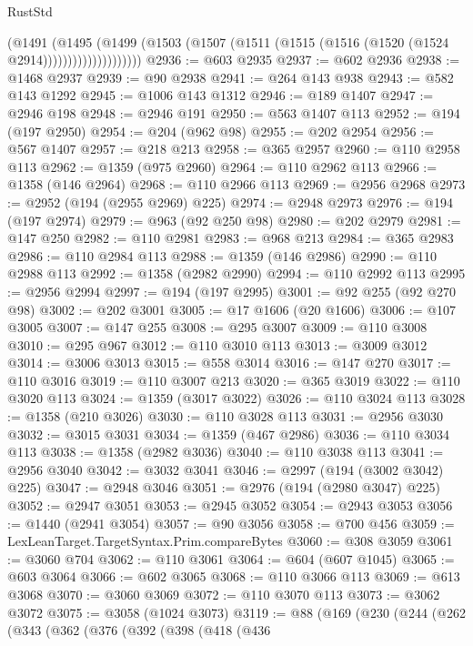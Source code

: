 \begin{lexlean}{RustStd}
\begin{coremodule}
                        (@1491
                          (@1495
                            (@1499
                              (@1503
                                (@1507 (@1511 (@1515 (@1516 (@1520 (@1524 @2914))))))))))))))))))))
@2936 := @603 @2935
@2937 := @602 @2936
@2938 := @1468 @2937
@2939 := @90 @2938
@2941 := @264 @143 @938
@2943 := @582 @143 @1292
@2945 := @1006 @143 @1312
@2946 := @189 @1407
@2947 := @2946 @198
@2948 := @2946 @191
@2950 := @563 @1407 @113
@2952 := @194 (@197 @2950)
@2954 := @204 (@962 @98)
@2955 := @202 @2954
@2956 := @567 @1407
@2957 := @218 @213
@2958 := @365 @2957
@2960 := @110 @2958 @113
@2962 := @1359 (@975 @2960)
@2964 := @110 @2962 @113
@2966 := @1358 (@146 @2964)
@2968 := @110 @2966 @113
@2969 := @2956 @2968
@2973 := @2952 (@194 (@2955 @2969) @225)
@2974 := @2948 @2973
@2976 := @194 (@197 @2974)
@2979 := @963 (@92 @250 @98)
@2980 := @202 @2979
@2981 := @147 @250
@2982 := @110 @2981
@2983 := @968 @213
@2984 := @365 @2983
@2986 := @110 @2984 @113
@2988 := @1359 (@146 @2986)
@2990 := @110 @2988 @113
@2992 := @1358 (@2982 @2990)
@2994 := @110 @2992 @113
@2995 := @2956 @2994
@2997 := @194 (@197 @2995)
@3001 := @92 @255 (@92 @270 @98)
@3002 := @202 @3001
@3005 := @17 @1606 (@20 @1606)
@3006 := @107 @3005
@3007 := @147 @255
@3008 := @295 @3007
@3009 := @110 @3008
@3010 := @295 @967
@3012 := @110 @3010 @113
@3013 := @3009 @3012
@3014 := @3006 @3013
@3015 := @558 @3014
@3016 := @147 @270
@3017 := @110 @3016
@3019 := @110 @3007 @213
@3020 := @365 @3019
@3022 := @110 @3020 @113
@3024 := @1359 (@3017 @3022)
@3026 := @110 @3024 @113
@3028 := @1358 (@210 @3026)
@3030 := @110 @3028 @113
@3031 := @2956 @3030
@3032 := @3015 @3031
@3034 := @1359 (@467 @2986)
@3036 := @110 @3034 @113
@3038 := @1358 (@2982 @3036)
@3040 := @110 @3038 @113
@3041 := @2956 @3040
@3042 := @3032 @3041
@3046 := @2997 (@194 (@3002 @3042) @225)
@3047 := @2948 @3046
@3051 := @2976 (@194 (@2980 @3047) @225)
@3052 := @2947 @3051
@3053 := @2945 @3052
@3054 := @2943 @3053
@3056 := @1440 (@2941 @3054)
@3057 := @90 @3056
@3058 := @700 @456
@3059 := LexLeanTarget.TargetSyntax.Prim.compareBytes
@3060 := @308 @3059
@3061 := @3060 @704
@3062 := @110 @3061
@3064 := @604 (@607 @1045)
@3065 := @603 @3064
@3066 := @602 @3065
@3068 := @110 @3066 @113
@3069 := @613 @3068
@3070 := @3060 @3069
@3072 := @110 @3070 @113
@3073 := @3062 @3072
@3075 := @3058 (@1024 @3073)
@3119 := @88
    (@169
      (@230
        (@244
          (@262
            (@343
              (@362
                (@376
                  (@392
                    (@398
                      (@418
                        (@436

\end{coremodule}
\end{lexlean}
